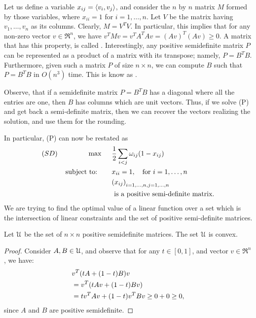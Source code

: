 Let us define a variable $x_{ij} = \left\langle {{\smash{v_{i}}},{\smash{v_{j}}}} \right\rangle$, and
consider the $n$ by $n$ matrix $M$ formed by those variables, where
$x_{ii}=1$ for $i=1,\ldots, n$. Let $V$ be the matrix having
$v_1,\ldots, v_n$ as its columns. Clearly, $M=V^T V$. In particular,
this implies that for any non-zero vector $v \in \Re^n$, we have
$v^T M v = v^T A^T A v = (A v)^T (A v) \geq 0$. A matrix that has this
property, is called . Interestingly, any
positive semidefinite matrix $P$ can be represented as a product of a
matrix with its transpose; namely, $P=B^T B$.  Furthermore, given such
a matrix $P$ of size $n \times n$, we can compute $B$ such that
$P = B^T B$ in $O(n^3)$ time. This is know as .

Observe, that if a semidefinite matrix $P = B^T B$ has a diagonal
where all the entries are one, then $B$ has columns which are unit
vectors. Thus, if we solve (P) and get back a semi-definite matrix,
then we can recover the vectors realizing the solution, and use them
for the rounding.

In particular, (P) can now be restated as
\begin{align*}
  (SD) \text{~~~~~~~~~~~~~}  \max \text{~~~~}& \frac{1}{2}\sum_{i < j} \WeightChar_{ij}(1 
                                               - x_{ij} )\\
  \text{ ~subject to: ~~~~~}&x_{ii}=1, \quad \text{for $i=1,\ldots, n$}\\
                                             & \pth{\MakeSBig x_{ij}}_{i=1,\ldots, n,
                                               j=1,\ldots,n} \\
  & \text{ is a positive semi-definite matrix}.
\end{align*}
We are trying to find the optimal value of a linear function over a
set which is the intersection of linear constraints and the set of
positive semi-definite matrices.

\begin{lemma}
    Let $\EuScript{U}$ be the set of $n\times n$ positive semidefinite
    matrices. The set $\EuScript{U}$ is convex.
\end{lemma}

\begin{proof}
    Consider $A, B \in \EuScript{U}$, and observe that for any
    $t \in [0,1]$, and vector $v \in \Re^n$, we have:
    \begin{align*}
        &v^T\pth{ \MakeSBig t A + (1-t)B } v \\
        &= v^T\pth{ \MakeSBig t Av
           + (1-t)Bv } \\
        &= t v^T Av + (1-t) v^T B v \geq 0 + 0 \geq 0,
    \end{align*}
    since $A$ and $B$ are positive semidefinite.
\end{proof}

